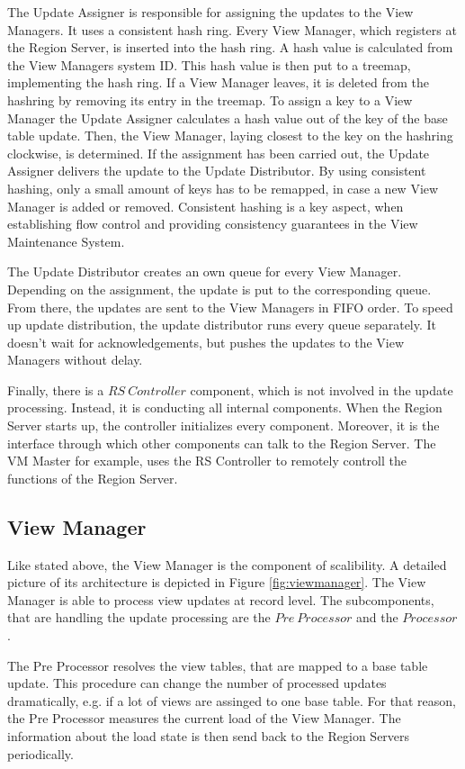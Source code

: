 \documentclass[11pt,a4paper,bibtotoc,idxtotoc,headsepline,footsepline,footexclude,BCOR12mm,DIV13]{scrbook}
\begin{document}
The Update Assigner is responsible for assigning the updates to the View Managers. It uses a consistent hash ring.  Every View Manager, which registers at the Region Server, is inserted into the hash ring. A hash value is calculated from the View Managers system ID. This hash value is then put to a treemap, implementing the hash ring. If a View Manager leaves, it is deleted from the hashring by removing its entry in the treemap. To assign a key to a View Manager the Update Assigner calculates a hash value out of the key of the base table update. Then, the View Manager, laying closest to the key on the hashring clockwise, is determined. If the assignment has been carried out, the Update Assigner delivers the update to the Update Distributor. By using consistent hashing, only a small amount of keys has to be remapped, in case a new View Manager is added or removed. Consistent hashing is a key aspect, when establishing flow control and providing consistency guarantees in the View Maintenance System.

The Update Distributor creates an own queue for every View Manager. Depending on the assignment, the update is put to the corresponding queue. From there, the updates are sent to the View Managers in FIFO order. To speed up update distribution, the update distributor runs every queue separately. It doesn't wait for acknowledgements, but pushes the updates to the View Managers without delay.
 
Finally, there is a $RS\:Controller$ component, which is not involved in the update processing. Instead, it is conducting all internal components. When the Region Server starts up, the controller initializes every component. Moreover, it is the interface through which other components can talk to the Region Server. The VM Master for example, uses the RS Controller to remotely controll the functions of the Region Server.\\ 

\subsection{View Manager}

Like stated above, the View Manager is the component of scalibility. A detailed picture of its architecture is depicted in Figure \ref{fig:viewmanager}. The View Manager is able to process view updates at record level. The subcomponents, that are handling the update processing are the $Pre\:Processor$ and the $Processor$.

The Pre Processor resolves the view tables, that are mapped to a base table update. This procedure can change the number of processed updates dramatically, e.g. if a lot of views are assinged to one base table. For that reason, the Pre Processor measures the current load of the View Manager. The information about the load state is then send back to the Region Servers periodically.
\end{document}
